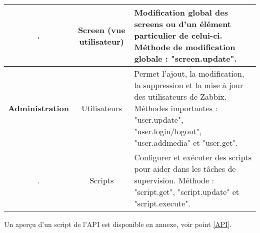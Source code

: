 \begin{tabular}{|c|c|m{9cm}|}
\hline
. & Screen (vue utilisateur) & Modification global des screens ou d'un élément particulier de celui-ci. Méthode de modification globale : "screen.update". \\ 

\hline
\bf Administration & Utilisateurs & Permet l'ajout, la modification, la suppression et la mise à jour des utilisateurs de Zabbix. Méthodes importantes : "user.update", "user.login/logout", "user.addmedia" et "user.get". \\

\hline
. & Scripts & Configurer et exécuter des scripts pour aider dans les tâches de supervision. Méthode : "script.get", "script.update" et "script.execute". \\

\hline
\end{tabular}

\vspace{0.3cm}

		Un aperçu d'un script de l'API est disponible en annexe, voir point \ref{API}.\\

\newpage
